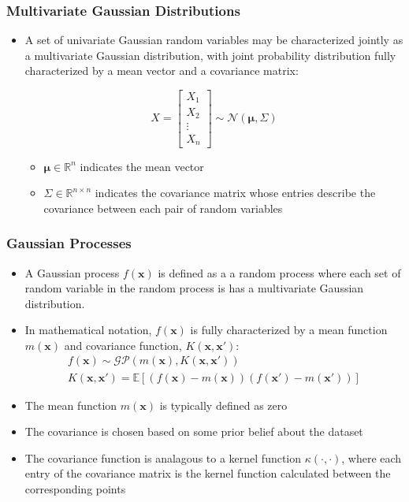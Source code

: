 \documentclass[pdf]{beamer}
\newcommand{\R}{\mathbb{R}}
\newcommand{\E}{\mathbb{E}}
\newcommand{\bx}{\boldsymbol{x}}
\begin{document}
\begin{frame}
  \frametitle{Multivariate Gaussian Distributions}

  \begin{itemize}
    \item A set of univariate Gaussian random variables may be characterized jointly as a multivariate Gaussian
      distribution, with joint probability distribution fully characterized by a mean vector and a covariance matrix:

      \[
        X = \begin{bmatrix}
                 X_{1} \\
                 X_{2} \\
                 \vdots \\
                 X_{n}
               \end{bmatrix}   \sim \mathcal{N}(\boldsymbol{\mu},\Sigma)
      \]
      \begin{itemize}
        \item $\boldsymbol{\mu} \in \R^{n}$ indicates the mean vector
        \item $\Sigma \in \R^{n \times n}$ indicates the covariance matrix whose entries describe the covariance between
          each pair of random variables
      \end{itemize}
  \end{itemize}
\end{frame}

\begin{frame}
  \frametitle{Gaussian Processes}
  \begin{itemize}
    \item A Gaussian process $f(\boldsymbol{x})$ is defined as a a random process where each set of random variable in
      the random process is has a multivariate Gaussian distribution.
    \item In mathematical notation, $f(\boldsymbol{x})$ is fully characterized by a mean function  $m(\boldsymbol{x})$
      and covariance function, $K(\boldsymbol{x},\boldsymbol{x'})$:
      \begin{gather*}
        f(\boldsymbol{x})\sim\mathcal{GP}(m(\boldsymbol{x}),K(\boldsymbol{x},\boldsymbol{x'})) \\
        K(\bx, \bx') = \E[(f(\bx) - m(\bx))(f(\bx') - m(\bx'))]
      \end{gather*}

    \item The mean function $m(\bx)$ is typically defined as zero
    \item The covariance is chosen based on some prior belief about the dataset
    \item The covariance function is analagous to a kernel function $\kappa(\cdot, \cdot)$, where each entry of the
      covariance matrix is the kernel function calculated between the corresponding points
  \end{itemize}
\end{frame}
\end{document}
